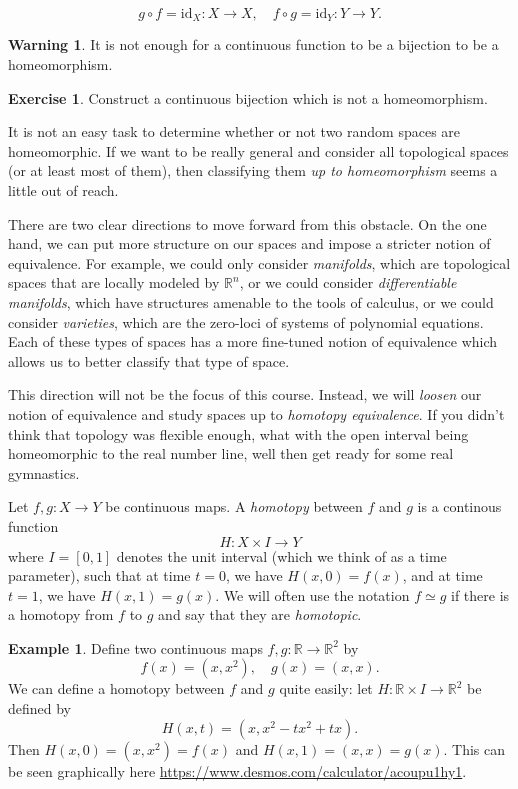 \documentclass[10pt]{amsart}
\theoremstyle{definition}
\newtheorem{ex}[thm]{Example}
\newtheorem{watchout}[thm]{\warning \textbf{Warning} \warning}
\newtheorem{exercise}[thm]{Exercise}
\newcommand{\cdef}[1]{\textcolor{Bittersweet}{#1}}
\begin{document}
\[g \circ f = \text{id}_X:X \to X, \quad f \circ g = \text{id}_Y:Y \to Y.\]

\begin{watchout}
    It is not enough for a continuous function to be a bijection to be a homeomorphism.
\end{watchout}

\begin{exercise}
    Construct a continuous bijection which is not a homeomorphism.
\end{exercise}

It is not an easy task to determine whether or not two random spaces are homeomorphic. If we want to be really general and consider all topological spaces (or at least most of them), then classifying them \emph{up to homeomorphism} seems a little out of reach. 

There are two clear directions to move forward from this obstacle. On the one hand, we can put more structure on our spaces and impose a stricter notion of equivalence. For example, we could only consider \emph{manifolds}, which are topological spaces that are locally modeled by $\mathbb{R}^n$, or we could consider \emph{differentiable manifolds}, which have structures amenable to the tools of calculus, or we could consider \emph{varieties}, which are the zero-loci of systems of polynomial equations. Each of these types of spaces has a more fine-tuned notion of equivalence which allows us to better classify that type of space.

This direction will not be the focus of this course. Instead, we will \emph{loosen} our notion of equivalence and study spaces up to \emph{homotopy equivalence}. If you didn't think that topology was flexible enough, what with the open interval being homeomorphic to the real number line, well then get ready for some real gymnastics.

Let $f, g:X \to Y$ be continuous maps. A \emph{\cdef{homotopy}} between $f$ and $g$ is a continous function
\[H:X \times I \to Y\]
where $I = [0,1]$ denotes the unit interval (which we think of as a time parameter), such that at time $t=0$, we have $H(x, 0) = f(x)$, and at time $t=1$, we have $H(x, 1) = g(x)$. We will often use the notation $f \simeq g$ if there is a homotopy from $f$ to $g$ and say that they are \cdef{\emph{homotopic}}.
\begin{ex}
\label{ex:homotopy between maps}
    Define two continuous maps $f, g:\mathbb{R} \to \mathbb{R}^2$ by
    \[f(x) = (x, x^2), \quad g(x)=(x, x).\]
    We can define a homotopy between $f$ and $g$ quite easily: let $H:\mathbb{R} \times I \to \mathbb{R}^2$ be defined by
    \[H(x, t) = (x,x^2-tx^2+tx).\]
    Then $H(x, 0) = (x,x^2) = f(x)$ and $H(x, 1) = (x, x) = g(x).$ This can be seen graphically here \url{https://www.desmos.com/calculator/acoupu1hy1}.
\end{ex}
\end{document}
